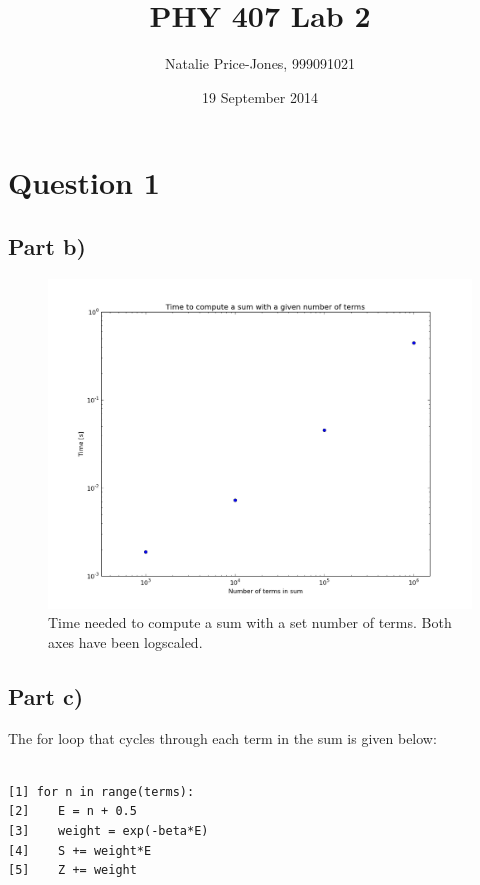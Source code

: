 \documentclass[a4paper,12pt]{article}
\begin{document}
\onehalfspacing
\title{PHY 407 Lab 2}
\author{Natalie Price-Jones, 999091021}
\date{19 September 2014}
\maketitle

\section{Question 1}
\subsection{Part b)}

\begin{figure}[H]
\centering
\includegraphics[width = \linewidth]{lab2q1b.png}
\caption{Time needed to compute a sum with a set number of terms. Both axes have been logscaled.}
\label{fig:q1}
\end{figure}

\subsection{Part c)}
The for loop that cycles through each term in the sum is given below:
\begin{verbatim}

[1] for n in range(terms):
[2]    E = n + 0.5
[3]    weight = exp(-beta*E)
[4]    S += weight*E
[5]    Z += weight

\end{verbatim}
\end{document}
